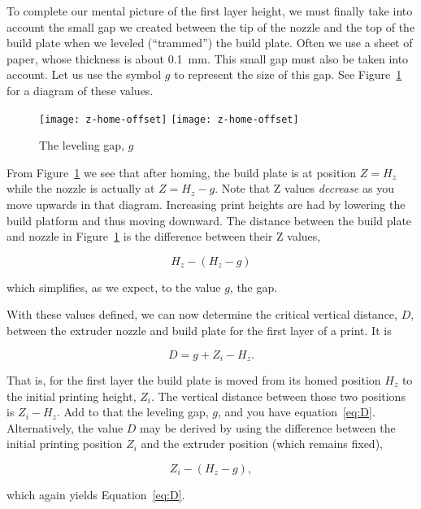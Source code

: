 To complete our mental picture of the first layer height, we must finally
take into account the small gap we created between the tip of the nozzle
and the top of the build plate when we leveled (``trammed'') the build
plate.  Often we use a sheet of paper, whose thickness is about 0.1~mm.
This small gap must also be taken into account.  Let us use the symbol $g$
to represent the size of this gap.  See Figure~\ref{fig:zhome} for a
diagram of these values.

\begin{figure}[!htbp]
  \centering
    \ifpdf
      \texttt{[image: z-home-offset]}
    \else
      \texttt{[image: z-home-offset]}
    \fi
    \caption{The leveling gap, $g$}
  \label{fig:zhome}
\end{figure}

From Figure~\ref{fig:zhome} we see that after homing, the build plate is
at position $Z=H_z$ while the nozzle is actually at $Z=H_z-g$.  Note that
Z values \emph{decrease} as you move upwards in that diagram.  Increasing
print heights are had by lowering the build platform and thus moving
downward.  The distance between the build plate and nozzle in
Figure~\ref{fig:zhome} is the difference between their Z values,

\begin{equation*}
H_z-(H_z-g)
\end{equation*}

which simplifies, as we expect, to the value $g$, the gap.

With these values defined, we can now determine the critical vertical distance,
$D$, between the extruder nozzle and build plate for the first layer of a
print. It is

\begin{equation}\label{eq:D}
D=g + Z_i - H_z.
\end{equation}

That is, for the first layer the build plate is moved from its homed position
$H_z$ to the initial printing height, $Z_i$.  The vertical distance between
those two positions is $Z_i-H_z$.  Add to that the leveling gap, $g$, and
you have equation~\ref{eq:D}.  Alternatively, the value $D$ may be derived by
using the difference between the initial printing position $Z_i$ and the
extruder position (which remains fixed),

\begin{equation*}
Z_i-(H_z-g),
\end{equation*}

which again yields Equation~\ref{eq:D}.

